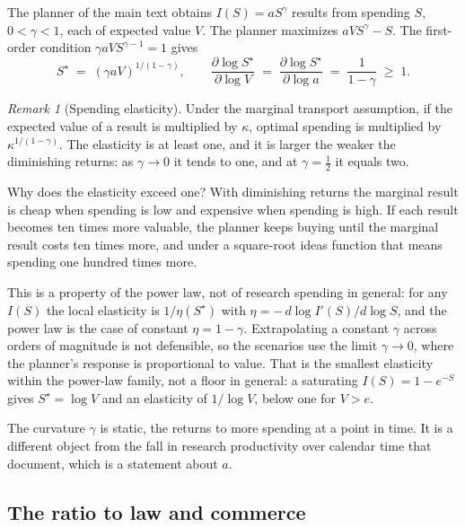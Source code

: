 \documentclass[11pt]{article}
\theoremstyle{definition}
\theoremstyle{remark}
\newtheorem{remark}{Remark}
\begin{document}
The planner of the main text obtains $I(S) = a S^{\gamma}$ results from spending $S$, $0 < \gamma < 1$, each of expected value $V$. The planner maximizes $a V S^{\gamma} - S$. The first-order condition $\gamma a V S^{\gamma-1} = 1$ gives
\begin{equation}
S^{\star} \;=\; \left(\gamma a V\right)^{1/(1 - \gamma)},
\qquad
\frac{\partial \log S^{\star}}{\partial \log V} \;=\; \frac{\partial \log S^{\star}}{\partial \log a} \;=\; \frac{1}{1 - \gamma} \;\ge\; 1.
\label{eq:foc}
\end{equation}

\begin{remark}[Spending elasticity]
Under the marginal transport assumption, if the expected value of a result is multiplied by $\kappa$, optimal spending is multiplied by $\kappa^{1/(1-\gamma)}$. The elasticity is at least one, and it is larger the weaker the diminishing returns: as $\gamma \to 0$ it tends to one, and at $\gamma = \tfrac12$ it equals two.
\end{remark}

Why does the elasticity exceed one? With diminishing returns the marginal result is cheap when spending is low and expensive when spending is high. If each result becomes ten times more valuable, the planner keeps buying until the marginal result costs ten times more, and under a square-root ideas function that means spending one hundred times more.

This is a property of the power law, not of research spending in general: for any $I(S)$ the local elasticity is $1/\eta(S^\star)$ with $\eta = -\,d\log I'(S)/d\log S$, and the power law is the case of constant $\eta = 1-\gamma$. Extrapolating a constant $\gamma$ across orders of magnitude is not defensible, so the scenarios use the limit $\gamma \to 0$, where the planner's response is proportional to value. That is the smallest elasticity within the power-law family, not a floor in general: a saturating $I(S) = 1 - e^{-S}$ gives $S^\star = \log V$ and an elasticity of $1/\log V$, below one for $V > e$.

The curvature $\gamma$ is static, the returns to more spending at a point in time. It is a different object from the fall in research productivity over calendar time that \citet{bloom2020} document, which is a statement about $a$.

\subsection*{The ratio to law and commerce}
\end{document}
